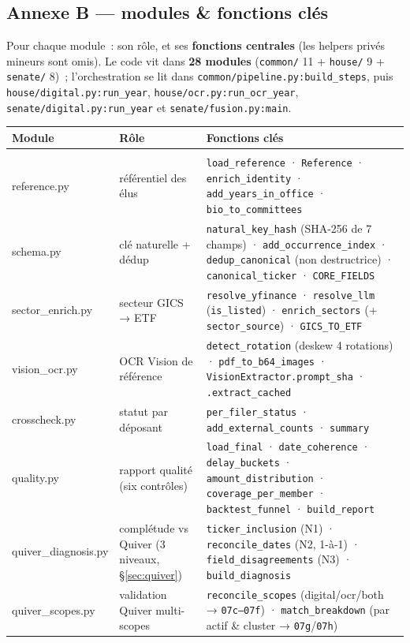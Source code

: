 \documentclass[11pt,a4paper]{article}
\newcommand{\co}[1]{\texttt{\small #1}}
\begin{document}
\subsection{Annexe B — modules \& fonctions clés}
\label{anx:modules}
Pour chaque module~: son rôle, et ses \textbf{fonctions centrales} (les helpers privés mineurs sont
omis). Le code vit dans \textbf{28 modules} (\co{common/} 11 + \co{house/} 9 + \co{senate/} 8)~;
l'orchestration se lit dans \co{common/pipeline.py:build_steps}, puis \co{house/digital.py:run_year},
\co{house/ocr.py:run_ocr_year}, \co{senate/digital.py:run_year} et \co{senate/fusion.py:main}.
{\footnotesize
\begin{longtable}{>{\ttfamily\footnotesize}p{2.6cm} p{3.9cm} p{8.6cm}}
\toprule
\normalfont\bfseries Module & \bfseries Rôle & \normalfont\bfseries Fonctions clés \\
\midrule\endhead
\multicolumn{3}{l}{\bfseries\color{coreC} common/ — le contrat universel partagé (11)}\\
reference.py & référentiel des élus & \co{load_reference} · \co{Reference} · \co{enrich_identity} · \co{add_years_in_office} · \co{bio_to_committees} \\
schema.py & clé naturelle + dédup & \co{natural_key_hash} (SHA-256 de 7 champs) · \co{add_occurrence_index} · \co{dedup_canonical} (non destructrice) · \co{canonical_ticker} · \co{CORE_FIELDS} \\
sector_enrich.py & secteur GICS → ETF & \co{resolve_yfinance} · \co{resolve_llm} (\co{is_listed}) · \co{enrich_sectors} (+ \co{sector_source}) · \co{GICS_TO_ETF} \\
vision_ocr.py & OCR Vision de référence & \co{detect_rotation} (deskew 4 rotations) · \co{pdf_to_b64_images} · \co{VisionExtractor.prompt_sha} · \co{.extract_cached} \\
crosscheck.py & statut par déposant & \co{per_filer_status} · \co{add_external_counts} · \co{summary} \\
quality.py & rapport qualité (six contrôles) & \co{load_final} · \co{date_coherence} · \co{delay_buckets} · \co{amount_distribution} · \co{coverage_per_member} · \co{backtest_funnel} · \co{build_report} \\
quiver_diagnosis.py & complétude vs Quiver (3 niveaux, \S{}\ref{sec:quiver}) & \co{ticker_inclusion} (N1) · \co{reconcile_dates} (N2, 1-à-1) · \co{field_disagreements} (N3) · \co{build_diagnosis} \\
quiver_scopes.py & validation Quiver multi-scopes & \co{reconcile_scopes} (digital/ocr/both → \co{07c--07f}) · \co{match_breakdown} (par actif \& cluster → \co{07g}/\co{07h}) \\

\end{longtable}}
\end{document}
